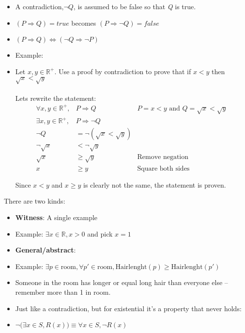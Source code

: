 \documentclass[english,10pt,a4paper]{article}
\begin{document}
\begin{theo} 
\begin{itemize}
\item A contradiction,$\neg Q$, is assumed to be false so that \textit{Q} is true.
\item[] $(P \Rightarrow Q) = true$ becomes $(P \Rightarrow \neg Q) = false$
\item[] $(P \Rightarrow Q) \Leftrightarrow (\neg Q \Rightarrow \neg P)$
\item Example:
\item[] Let $x, y \in \mathbb{R}^{+}$. Use a proof by contradiction to prove that if $x<y$ then $\sqrt{x} < \sqrt{y}$
\\
\\
Lets rewrite the statement:
\begin{align}
\forall x, y \in \mathbb{R}^+, &P \Rightarrow Q & P = x < y \text{ and } Q = \sqrt{x}<\sqrt{y} \\
\exists x, y \in \mathbb{R}^+, &P \Rightarrow \neg Q \\
\neg Q &= \neg(\sqrt{x} < \sqrt{y})\\
\neg\sqrt{x} &< \neg \sqrt{y} \\
\sqrt{x} &\geq \sqrt{y} & \text{Remove negation}\\
x &\geq y & \text{Square both sides}
\end{align}

Since $x<y$ and $x\geq y$ is clearly not the same, the statement is proven.
\end{itemize}
\end{theo}


\begin{theo} 
 There are two kinds:
\begin{itemize}
\item \textbf{Witness}: A single example
\item[] Example: $\exists x \in \mathbb{R}, x > 0$ and pick $x=1$
\item \textbf{General/abstract}: 
\item[] Example: $\exists p \in \text{room}, \forall p' \in \text{room}, \text{Hairlenght}(p) \geq \text{Hairlenght}(p')$
\item[] Someone in the room has longer or equal long hair than everyone else -- remember more than 1 in room.
\end{itemize}
\end{theo}


\begin{theo} 
\begin{itemize}
\item Just like a contradiction, but for existential it's a property that never holds:
\item $\neg \big(\exists x \in S, R(x)\big) \equiv \forall x \in S, \neg R(x)$
\end{itemize}
\end{theo}
\end{document}
